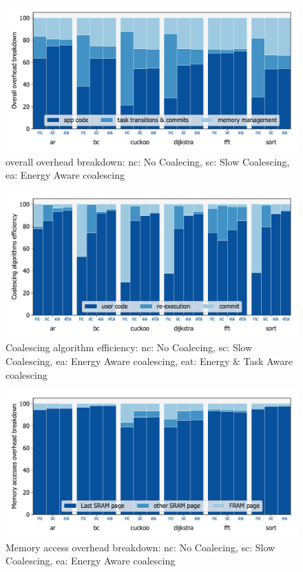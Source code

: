 \begin{figure}
	\centering
	\includegraphics[width=\columnwidth]{figures/overallOverhead}
	\caption{ overall overhead breakdown: nc: No Coalecing, sc: Slow Coalescing, ea: Energy Aware coalescing }
	\label{fig:overallOverheadBreakdown}
\end{figure}


\begin{figure}
	\centering
	\includegraphics[width=\columnwidth]{figures/coalEfficiency}
	\caption{ Coalescing algorithm efficiency:  nc: No Coalecing, sc: Slow Coalescing, ea: Energy Aware coalescing, eat: Energy \& Task Aware coalescing }
	\label{fig:coalEfficiency}
\end{figure}

\begin{figure}
	\centering
	\includegraphics[width=\columnwidth]{figures/memAccess}
	\caption{ Memory access overhead breakdown:  nc: No Coalecing, sc: Slow Coalescing, ea: Energy Aware coalescing }
	\label{fig:coalEfficiency}
\end{figure}

